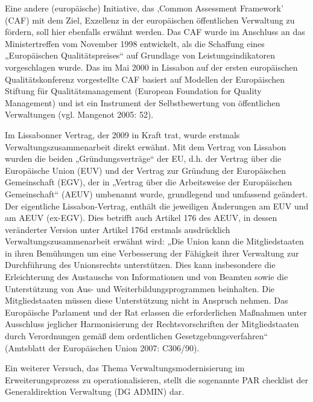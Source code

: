 Eine andere (europäische) Initiative, das ‚Common Assessment Framework’ (CAF) mit dem Ziel, Exzellenz in der europäischen öffentlichen Verwaltung zu fördern, soll hier ebenfalls erwähnt werden. Das CAF wurde im Anschluss an das Ministertreffen vom November 1998 entwickelt, als die Schaffung eines „Europäischen Qualitätspreises“ auf Grundlage von Leistungsindikatoren vorgeschlagen wurde. Das im Mai 2000 in Lissabon auf der ersten europäischen Qualitätskonferenz vorgestellte CAF basiert auf Modellen der Europäischen Stiftung für Qualitätsmanagement (European Foundation for Quality Management) und ist ein Instrument der Selbstbewertung von öffentlichen Verwaltungen (vgl. Mangenot 2005: 52).\par
Im Lissabonner Vertrag, der 2009 in Kraft trat, wurde erstmals Verwaltungszusammenarbeit direkt erwähnt. Mit dem Vertrag von Lissabon wurden die beiden „Gründungsverträge“ der EU, d.h. der Vertrag über die Europäische Union (EUV) und der Vertrag zur Gründung der Europäischen Gemeinschaft (EGV), der in „Vertrag über die Arbeitsweise der Europäischen Gemeinschaft“ (AEUV) umbenannt wurde, grundlegend und umfassend geändert. Der eigentliche Lissabon-Vertrag, enthält die jeweiligen Änderungen am EUV und am AEUV (ex-EGV). Dies betrifft auch Artikel 176 des AEUV, in dessen veränderter Version unter Artikel 176d erstmals ausdrücklich Verwaltungszusammenarbeit erwähnt wird: „Die Union kann die Mitgliedstaaten in ihren Bemühungen um eine Verbesserung der Fähigkeit ihrer Verwaltung zur Durchführung des Unionsrechts unterstützen. Dies kann insbesondere die Erleichterung des Austauschs von Informationen und von Beamten sowie die Unterstützung von Aus- und Weiterbildungsprogrammen beinhalten. Die Mitgliedstaaten müssen diese Unterstützung nicht in Anspruch nehmen. Das Europäische Parlament und der Rat erlassen die erforderlichen Maßnahmen unter Ausschluss jeglicher Harmonisierung der Rechtsvorschriften der Mitgliedstaaten durch Verordnungen gemäß dem ordentlichen Gesetzgebungsverfahren“ (Amtsblatt der Europäischen Union 2007: C306/90). \par
Ein weiterer Versuch, das Thema Verwaltungsmodernisierung im Erweiterungsprozess zu operationalisieren, stellt die sogenannte PAR checklist der Generaldirektion Verwaltung (DG ADMIN) dar. 

